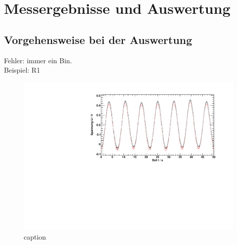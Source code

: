 \section{Messergebnisse und Auswertung}

\subsection{Vorgehensweise bei der Auswertung}
Fehler: immer ein Bin.\\
Beispiel: R1
\begin{figure}[H]
\begin{center}
  \includegraphics[width=\textwidth]{../img/both_Spule_R1.pdf}
  \caption{caption}
  \label{img:ex:both}
\end{center}
\end{figure}

